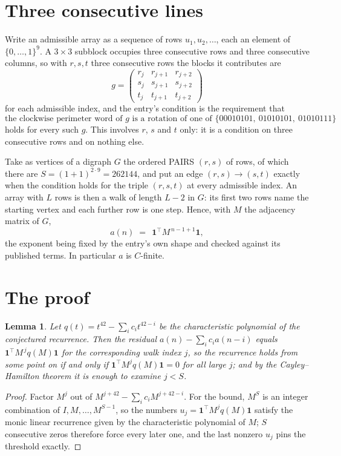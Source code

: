 \documentclass[11pt,a4paper]{article}
\theoremstyle{plain}
\newtheorem{lemma}[theorem]{Lemma}
\theoremstyle{definition}
\begin{document}
\section{Three consecutive lines}

Write an admissible array as a sequence of rows $u_1,u_2,\dots$, each an element of
$\{0,\dots,1\}^{9}$. A $3\times3$ subblock occupies three consecutive rows and
three consecutive columns, so with $r,s,t$ three consecutive rows the blocks it
contributes are
\[
g=\begin{pmatrix}r_j&r_{j+1}&r_{j+2}\\ s_j&s_{j+1}&s_{j+2}\\ t_j&t_{j+1}&t_{j+2}\end{pmatrix}
\]
for each admissible index, and the entry's condition is the requirement that
\[
\text{the clockwise perimeter word of }g\text{ is a rotation of one of }\{00010101,\ 01010101,\ 01010111\}
\]
holds for every such $g$. This involves $r$, $s$ and $t$ only: it is a condition on
three consecutive rows and on nothing else.

Take as vertices of a digraph $G$ the ordered PAIRS $(r,s)$ of rows, of which there are
$S=(1+1)^{2\cdot9}=262144$, and put an edge $(r,s)\to(s,t)$ exactly when the condition
holds for the triple $(r,s,t)$ at every admissible index. An array with $L$ rows is then a
walk of length $L-2$ in $G$: its first two rows name the starting vertex and each further
row is one step. Hence, with $M$ the adjacency matrix of $G$,
\[
a(n)\;=\;\,\mathbf{1}^{\!\top}M^{\,n-1+1}\mathbf{1},
\]
the exponent being fixed by the entry's own shape and checked against its published terms.
In particular $a$ is $C$-finite.

\section{The proof}

\begin{lemma}\label{lem:crit}
Let $q(t)=t^{42}-\sum_i c_it^{42-i}$ be the characteristic polynomial of the
conjectured recurrence. Then the residual $a(n)-\sum_ic_ia(n-i)$ equals
$\mathbf{1}^{\!\top}M^{\,j}q(M)\mathbf{1}$ for the corresponding walk index
$j$, so the recurrence holds from some point on if and only if
$\mathbf{1}^{\!\top}M^{j}q(M)\mathbf{1}=0$ for all large $j$; and by the
Cayley--Hamilton theorem it is enough to examine $j<S$.
\end{lemma}

\begin{proof}
Factor $M^{j}$ out of $M^{j+42}-\sum_ic_iM^{j+42-i}$. For the bound, $M^{S}$
is an integer combination of $I,M,\dots,M^{S-1}$, so the numbers
$u_j=\mathbf{1}^{\!\top}M^{j}q(M)\mathbf{1}$ satisfy the monic linear recurrence given by
the characteristic polynomial of $M$; $S$ consecutive zeros therefore force every later one,
and the last nonzero $u_j$ pins the threshold exactly.
\end{proof}
\end{document}
